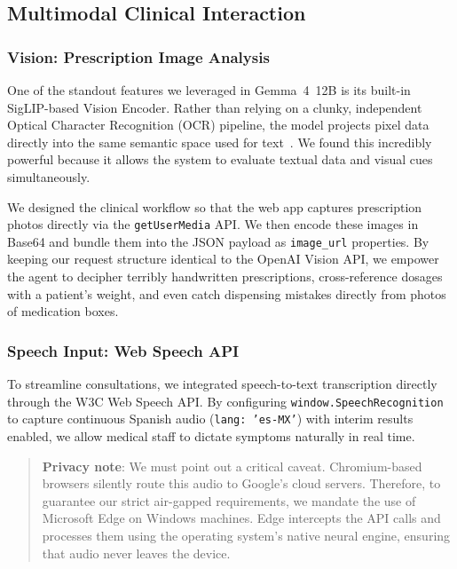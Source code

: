 \documentclass[9pt,conference]{IEEEtran}
\begin{document}

\subsection{Multimodal Clinical Interaction}
\label{subsec:multimodal}

\subsubsection{Vision: Prescription Image Analysis}

One of the standout features we leveraged in Gemma~4~12B is its built-in SigLIP-based Vision Encoder. Rather than relying on a clunky, independent Optical Character Recognition (OCR) pipeline, the model projects pixel data directly into the same semantic space used for text~\cite{alayrac2022flamingo}. We found this incredibly powerful because it allows the system to evaluate textual data and visual cues simultaneously.

We designed the clinical workflow so that the web app captures prescription photos directly via the \texttt{getUserMedia} API. We then encode these images in Base64 and bundle them into the JSON payload as \texttt{image\_url} properties. By keeping our request structure identical to the OpenAI Vision API, we empower the agent to decipher terribly handwritten prescriptions, cross-reference dosages with a patient's weight, and even catch dispensing mistakes directly from photos of medication boxes.

\subsubsection{Speech Input: Web Speech API}

To streamline consultations, we integrated speech-to-text transcription directly through the W3C Web Speech API. By configuring \texttt{window.SpeechRecognition} to capture continuous Spanish audio (\texttt{lang: 'es-MX'}) with interim results enabled, we allow medical staff to dictate symptoms naturally in real time. 

\begin{quote}
\scriptsize
\textbf{Privacy note}: We must point out a critical caveat. Chromium-based browsers silently route this audio to Google's cloud servers. Therefore, to guarantee our strict air-gapped requirements, we mandate the use of Microsoft Edge on Windows machines. Edge intercepts the API calls and processes them using the operating system's native neural engine, ensuring that audio never leaves the device.
\end{quote}
\end{document}
